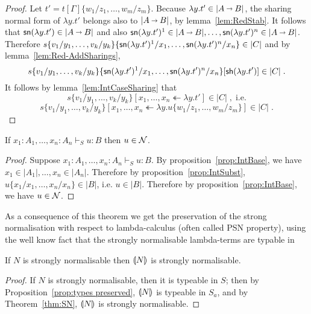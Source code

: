 \documentclass{llncs} %
\begin{document}
\begin{proof}
Let  $t' = t[\Gamma]\{w_1/z_1,\dots,w_m/z_m\}$. Because $\lambda y.t'\in |A \vlim B|$, the sharing normal form of $\lambda y.t'$ belongs also to $|A \vlim B|$, by lemma~\ref{lem:RedStab}. It follows that $\sn (\lambda y.t') \in |A \vlim B|$ and also $\sn (\lambda y.t')^1 \in |A \vlim B|, \dots, \sn (\lambda y.t')^n \in |A \vlim B|$. Therefore 
$ s  \{v_1/y_1,\dots,v_k/y_k\}  \{{\mathsf{sn}} (\lambda y.t')^1/x_1,\dots, {\mathsf{sn}} (\lambda y.t')^n/x_n\} \in |C|$ and by lemma~\ref{lem:Red-AddSharings},
\[
s  \{v_1/y_1,\dots,v_k/y_k\}  \{{\mathsf{sn}} (\lambda y.t')^1/x_1,\dots, {\mathsf{sn}} (\lambda y.t')^n/x_n\}[{\mathsf{sh}} (\lambda y.t')] \in |C|\;.
\]
It follows by lemma~\ref{lem:IntCaseSharing} that
\[s \{v_1/y_1,\dots,v_k/y_k\}[x_1,\dots, x_n \twoheadleftarrow \lambda y.t'] \in |C|\;,\;\mbox{i.e.}\]
\[
s\{v_1/y_1,\dots,v_k/y_k\} [x_1,\dots, x_n \twoheadleftarrow \lambda y.u\{w_1/z_1,\dots,w_m/z_m\} ] \in |C|\;.
\]
\end{proof}


\begin{theorem}\label{thm:SN}
If $x_1:A_1,\dots, x_n:A_n \vdash_S u:B$ then $u \in \mathcal{N}$.
\end{theorem}



\begin{proof}
 
Suppose $x_1:A_1,\dots, x_n:A_n \vdash_S u:B$. By proposition~\ref{prop:IntBase}, we have $x_1\in |A_1|,\dots, x_n \in|A_n|$. Therefore by proposition~\ref{prop:IntSubst},  $u\{x_1/x_1, \dots, x_n/x_n\} \in |B|$, i.e. $u \in |B|$. Therefore by proposition~\ref{prop:IntBase}, we have $u \in \mathcal{N}$.

\end{proof}

\noindent
As a consequence of this theorem we get the preservation of the strong normalisation with respect to lambda-calculus (often called PSN property), using the well know fact that the strongly normalisable lambda-terms are typable in %


\begin{theorem}[PSN]
If $N$ is strongly normalisable then ${\llparenthesis{N}\rrparenthesis_{{}}}$ is strongly normalisable.
\end{theorem}

\begin{proof}
If $N$ is strongly normalisable, then it is typeable in $S$; then by Proposition~\ref{prop:types preserved}, ${\llparenthesis{N}\rrparenthesis_{{}}}$ is typeable in $S_a$, and by Theorem~\ref{thm:SN}, ${\llparenthesis{N}\rrparenthesis_{{}}}$ is strongly normalisable.
\end{proof}
\end{document}
